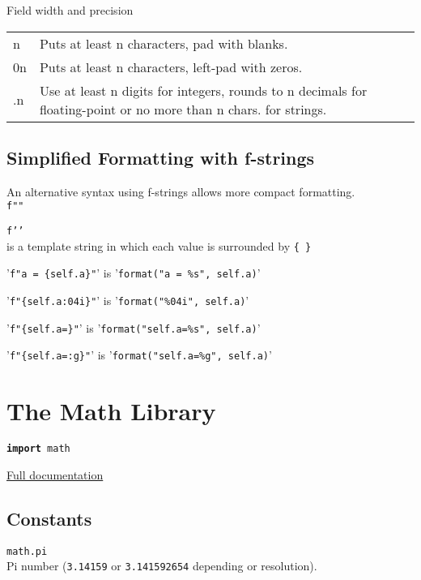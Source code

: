 \hangpar \textsf{Field width} and \textsf{precision}\\
\begin{tabular}{@{}lp{}}
\textsf{n} & Puts at least \textsf{n} characters, pad with blanks. \\
\textsf{0n} & Puts at least \textsf{n} characters, left-pad with zeros. \\
\textsf{.n} & Use at least \textsf{n} digits for integers, rounds to \textsf{n} decimals for floating-point or no more than \textsf{n} chars. for strings. \\
\end{tabular}

\subsection*{Simplified Formatting with f-strings}

\hangpar An alternative syntax using f-strings allows more compact formatting.\\

\hangpar \texttt{f"}\texttt{"}

\hangpar \texttt{f'}\texttt{'}\\

 is a template string in which each value is surrounded by \texttt{\{ \}}

'\texttt{f"a = \{self.a\}"}' is  '\texttt{format("a = \%s", self.a)}'

'\texttt{f"\{self.a:04i\}"}' is  '\texttt{format("\%04i", self.a)}'

'\texttt{f"\{self.a=\}"}' is  '\texttt{format("self.a=\%s", self.a)}'

'\texttt{f"\{self.a=:g\}"}' is  '\texttt{format("self.a=\%g", self.a)}'

\section*{The Math Library}

\hangpar \texttt{\textbf{import} math}

\hangpar \href{https://github.com/berry-lang/berry/wiki/Chapter-7\#math-module}{Full documentation}

\subsection*{Constants}

\hangpar \texttt{math.pi}\\
Pi number (\texttt{3.14159} or \texttt{3.141592654} depending or resolution).

